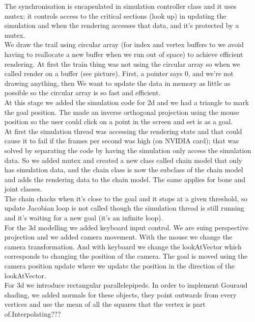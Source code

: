 \documentclass[paper=a4, fontsize=11pt]{scrartcl} %
\numberwithin{equation}{section} %
\numberwithin{figure}{section} %
\numberwithin{table}{section} %
\begin{document}
The synchronisation is encapsulated in simulation controller class and it uses mutex; it controls access to the critical sections (look up) in updating the simulation and when the rendering accesses that data, and it's protected by a mutex. \\

We draw the trail using circular array (for index and vertex buffers to we avoid having to reallocate a new buffer when we run out of space) to achieve efficient rendering. At first the train thing was not using the circular array so when we called render on a buffer (see picture). First, a pointer says 0, and we're not drawing anything, then We want to update the data in memory as little as possible so the circular array is so fast and efficient. \\

At this stage we added the simulation code for 2d and we had a triangle to mark the goal position. The made an inverse orthogonal projection using the mouse position so the user could click on a point in the screen and set is as a goal. \\

At first the simulation thread was accessing the rendering state and that could cause it to fail if the frames per second was high (on NVIDIA card); that was solved by separating the code by having the simulation only access the simulation data. So we added mutex and created a new class called chain model that only has simulation data, and the chain class is now the subclass of the chain model and adds the rendering data to the chain model. The same applies for bone and joint classes. \\

The chain chacks when it's close to the goal and it stops at a given threshold, so update Jacobian loop is not called though the simulation thread is still running and it's waiting for a new goal (it's an infinite loop). \\

For the 3d modelling we added keyboard input control. We are suing perspective projection and we added camera movement. With the mouse we change the camera transformation. And with keyboard we change the lookAtVector which corresponds to changing the position of the camera. The goal is moved using the camera position update where we update the position in the direction of the lookAtVector.\\

For 3d we introduce rectangular parallelepipeds. In order to implement Gouraud shading, we added normals for these objects, they point outwards from every vertices and use the mean of all the squares that the vertex is part of.Interpolating??? \\
\end{document}
